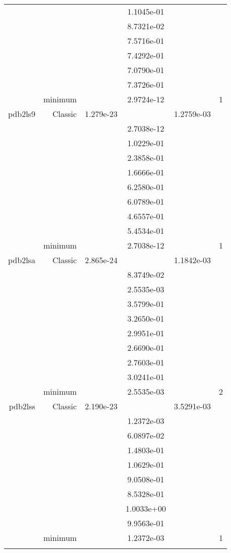 \begin{xltabular}{\textwidth}{r|rS[table-format=1.3e+2]S[table-format=1.4e+2]S[table-format=1.4e+2]S[table-format=-1.5]}
&  &  & 1.1045e-01 & & \\
&  &  & 8.7321e-02 & & \\
&  &  & 7.5716e-01 & & \\
&  &  & 7.4292e-01 & & \\
&  &  & 7.0790e-01 & & \\
&  &  & 7.3726e-01 & & \\
& minimum &  & 2.9724e-12 & & 1 \\  \addlinespace
pdb2ls9 & Classic & 1.279e-23 &  & 1.2759e-03 & \\
&  &  & 2.7038e-12 & & \\
&  &  & 1.0229e-01 & & \\
&  &  & 2.3858e-01 & & \\
&  &  & 1.6666e-01 & & \\
&  &  & 6.2580e-01 & & \\
&  &  & 6.0789e-01 & & \\
&  &  & 4.6557e-01 & & \\
&  &  & 5.4534e-01 & & \\
& minimum &  & 2.7038e-12 & & 1 \\  \addlinespace
pdb2lsa & Classic & 2.865e-24 &  & 1.1842e-03 & \\
&  &  & 8.3749e-02 & & \\
&  &  & 2.5535e-03 & & \\
&  &  & 3.5799e-01 & & \\
&  &  & 3.2650e-01 & & \\
&  &  & 2.9951e-01 & & \\
&  &  & 2.6690e-01 & & \\
&  &  & 2.7603e-01 & & \\
&  &  & 3.0241e-01 & & \\
& minimum &  & 2.5535e-03 & & 2 \\  \addlinespace
pdb2lss & Classic & 2.190e-23 &  & 3.5291e-03 & \\
&  &  & 1.2372e-03 & & \\
&  &  & 6.0897e-02 & & \\
&  &  & 1.4803e-01 & & \\
&  &  & 1.0629e-01 & & \\
&  &  & 9.0508e-01 & & \\
&  &  & 8.5328e-01 & & \\
&  &  & 1.0033e+00 & & \\
&  &  & 9.9563e-01 & & \\
& minimum &  & 1.2372e-03 & & 1 \\  \addlinespace

\end{xltabular}
